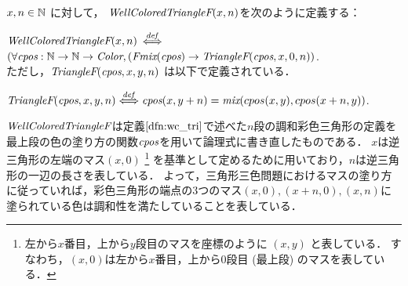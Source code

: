 \begin{dfn}[$\WCTF$]\rm
  $x, n \in \mathbb{N}$ に対して，
  $\textit{WellColoredTriangleF}(x, n)$を次のように定義する：
  
  $\textit{WellColoredTriangleF}(x, n)$ $\overset{{\it def}}{\Longleftrightarrow}$ $(\forall \textit{cpos}: \mathbb{N} \to \mathbb{N} \to \textit{Color}, (\textit{Fmix}(\textit{cpos}) \to \textit{TriangleF}(\textit{cpos},x,0,n))$. \\
  
  ただし，$\textit{TriangleF}(\textit{cpos},x,y,n)$ は以下で定義されている．

  $\textit{TriangleF}(\textit{cpos},x,y,n) \overset{{\it def}}{\Longleftrightarrow}
  \textit{cpos}(x,y+n) = \textit{mix}(cpos(x,y),cpos(x+n,y))$.
\end{dfn}
$\WCTF$は定義$\ref{dfn:wc_tri}$で述べた$n$段の調和彩色三角形の定義を最上段の色の塗り方の関数$\textit{cpos}$を用いて論理式に書き直したものである．
$x$は逆三角形の左端のマス$(x,0)$
\footnote
    {
      左から$x$番目，上から$y$段目のマスを座標のように $(x,y)$ と表している．
      すなわち，$(x,0)$は左から$x$番目，上から$0$段目 (最上段) のマスを表している．
    }
    を基準として定めるために用いており，$n$は逆三角形の一辺の長さを表している．
    よって，三角形三色問題におけるマスの塗り方に従っていれば，彩色三角形の端点の$3$つのマス$(x,0), (x+n,0), (x,n)$に塗られている色は調和性を満たしていることを表している．

